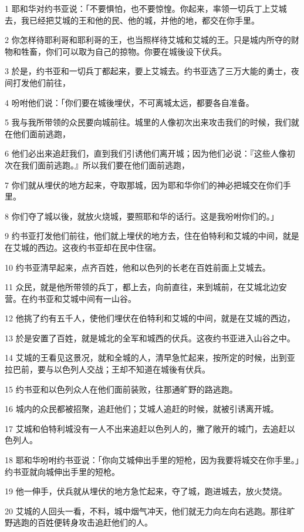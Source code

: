 \par 1 耶和华对约书亚说：「不要惧怕，也不要惊惶。你起来，率领一切兵丁上艾城去，我已经把艾城的王和他的民、他的城，并他的地，都交在你手里。
\par 2 你怎样待耶利哥和耶利哥的王，也当照样待艾城和艾城的王。只是城内所夺的财物和牲畜，你们可以取为自己的掠物。你要在城後设下伏兵。
\par 3 於是，约书亚和一切兵丁都起来，要上艾城去。约书亚选了三万大能的勇士，夜间打发他们前往，
\par 4 吩咐他们说：「你们要在城後埋伏，不可离城太远，都要各自准备。
\par 5 我与我所带领的众民要向城前往。城里的人像初次出来攻击我们的时候，我们就在他们面前逃跑，
\par 6 他们必出来追赶我们，直到我们引诱他们离开城；因为他们必说：『这些人像初次在我们面前逃跑。』所以我们要在他们面前逃跑，
\par 7 你们就从埋伏的地方起来，夺取那城，因为耶和华你们的神必把城交在你们手里。
\par 8 你们夺了城以後，就放火烧城，要照耶和华的话行。这是我吩咐你们的。」
\par 9 约书亚打发他们前往，他们就上埋伏的地方去，住在伯特利和艾城的中间，就是在艾城的西边。这夜约书亚却在民中住宿。
\par 10 约书亚清早起来，点齐百姓，他和以色列的长老在百姓前面上艾城去。
\par 11 众民，就是他所带领的兵丁，都上去，向前直往，来到城前，在艾城北边安营。在约书亚和艾城中间有一山谷。
\par 12 他挑了约有五千人，使他们埋伏在伯特利和艾城的中间，就是在艾城的西边，
\par 13 於是安置了百姓，就是城北的全军和城西的伏兵。这夜约书亚进入山谷之中。
\par 14 艾城的王看见这景况，就和全城的人，清早急忙起来，按所定的时候，出到亚拉巴前，要与以色列人交战；王却不知道在城後有伏兵。
\par 15 约书亚和以色列众人在他们面前装败，往那通旷野的路逃跑。
\par 16 城内的众民都被招聚，追赶他们；艾城人追赶的时候，就被引诱离开城。
\par 17 艾城和伯特利城没有一人不出来追赶以色列人的，撇了敞开的城门，去追赶以色列人。
\par 18 耶和华吩咐约书亚说：「你向艾城伸出手里的短枪，因为我要将城交在你手里。」约书亚就向城伸出手里的短枪。
\par 19 他一伸手，伏兵就从埋伏的地方急忙起来，夺了城，跑进城去，放火焚烧。
\par 20 艾城的人回头一看，不料，城中烟气冲天，他们就无力向左向右逃跑。那往旷野逃跑的百姓便转身攻击追赶他们的人。
